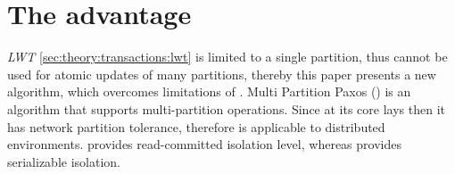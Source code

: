 
\section{The advantage}
\emph{LWT} \ref{sec:theory:transactions:lwt} is limited to a single partition, thus \lwt cannot be used for atomic updates of many partitions, thereby this paper presents a new algorithm, which overcomes limitations of \lwt.
Multi Partition Paxos (\mpp) is an algorithm that supports multi-partition operations. Since at its core lays \paxos then it has network partition tolerance, therefore is applicable to distributed environments. \mpp provides read-committed isolation level, whereas \lwt provides serializable isolation.